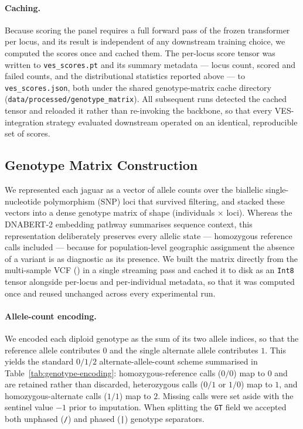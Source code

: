 \documentclass[twocolumn,10pt]{article}
\begin{document}
\paragraph{Caching.} Because scoring the panel requires a full forward pass of the frozen
transformer per locus, and its result is independent of any downstream training choice, we computed
the scores once and cached them. The per-locus score tensor was written to \texttt{ves\_scores.pt}
and its summary metadata --- locus count, scored and failed counts, and the distributional
statistics reported above --- to \texttt{ves\_scores.json}, both under the shared genotype-matrix
cache directory (\texttt{data/processed/genotype\_matrix}). All subsequent runs detected the cached
tensor and reloaded it rather than re-invoking the backbone, so that every VES-integration strategy
evaluated downstream operated on an identical, reproducible set of scores.

\subsection{Genotype Matrix Construction}
We represented each jaguar as a vector of allele counts over the biallelic single-nucleotide
polymorphism (SNP) loci that survived filtering, and stacked these vectors into a dense genotype
matrix of shape (individuals $\times$ loci). Whereas the DNABERT-2 embedding pathway summarises
sequence context, this representation deliberately preserves every allelic state --- homozygous
reference calls included --- because for population-level geographic assignment the absence of a
variant is as diagnostic as its presence. We built the matrix directly from the multi-sample VCF
(\texttt{}) in a
single streaming pass and cached it to disk as an \texttt{Int8} tensor alongside per-locus and
per-individual metadata, so that it was computed once and reused unchanged across every experimental
run.

\paragraph{Allele-count encoding.} We encoded each diploid genotype as the sum of its two allele
indices, so that the reference allele contributes $0$ and the single alternate allele contributes
$1$. This yields the standard $0/1/2$ alternate-allele-count scheme summarised in
Table~\ref{tab:genotype-encoding}: homozygous-reference calls ($0/0$) map to $0$ and are retained
rather than discarded, heterozygous calls ($0/1$ or $1/0$) map to $1$, and homozygous-alternate
calls ($1/1$) map to $2$. Missing calls were set aside with the sentinel value $-1$ prior to
imputation. When splitting the \texttt{GT} field we accepted both unphased (\texttt{/}) and phased
(\texttt{|}) genotype separators.
\end{document}
